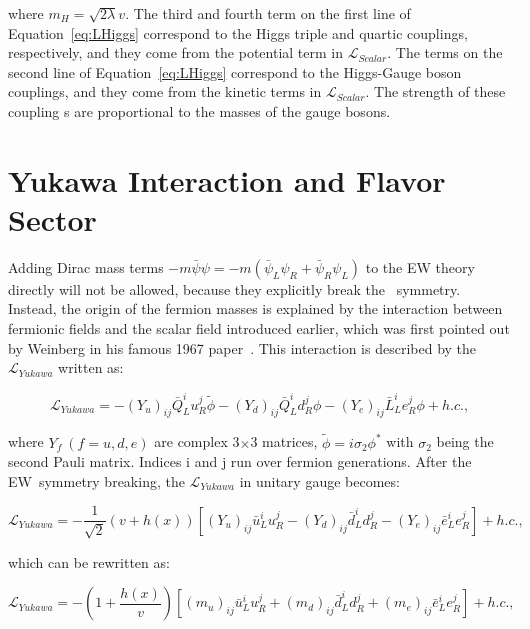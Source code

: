 where $m_{H}=\sqrt{2\lambda}v$. The third and fourth term on the first line of Equation~\ref{eq:LHiggs} correspond to the Higgs triple and quartic couplings, respectively, and they come from the potential term in $\mathcal{L}_{Scalar}$. The terms on the second line of Equation~\ref{eq:LHiggs} correspond to the Higgs-Gauge boson couplings, and they come from the kinetic terms in $\mathcal{L}_{Scalar}$. The strength of these coupling s are proportional to the masses of the gauge bosons. 

\section{Yukawa Interaction and Flavor Sector}
\label{sec:Flavor}

Adding Dirac mass terms $-m\bar{\psi}\psi=-m(\bar{\psi}_{L}\psi_{R}+\bar{\psi}_{R}\psi_{L})$ to the \ac{EW} theory directly will not be allowed, because they explicitly break the \ew~symmetry. Instead, the origin of the fermion masses is explained by the interaction between fermionic fields and the scalar field introduced earlier, which was first pointed out by Weinberg in his famous 1967 paper~\cite{Weinberg:1967tq}. This interaction is described by the $\mathcal{L}_{Yukawa}$ written as:

\begin{equation}
\mathcal{L}_{Yukawa}=-(Y_{u})_{ij}\bar{Q}_{L}^{i}u_{R}^{j}\tilde{\phi}-(Y_{d})_{ij}\bar{Q}_{L}^{i}d_{R}^{j}\phi-(Y_{e})_{ij}\bar{L}_{L}^{i}e_{R}^{j}\phi + h.c.,
\end{equation}

where $Y_{f}~(f=u,d,e)$ are complex 3$\times$3 matrices, $\tilde{\phi}=i\sigma_{2}\phi^{*}$ with $\sigma_{2}$ being the second Pauli matrix. Indices i and j run over fermion generations. After the \ac{EW}~symmetry breaking, the $\mathcal{L}_{Yukawa}$ in unitary gauge becomes:

\begin{equation}
\mathcal{L}_{Yukawa}=-\frac{1}{\sqrt{2}}(v+h(x))[(Y_{u})_{ij}\bar{u}_{L}^{i}u_{R}^{j}-(Y_{d})_{ij}\bar{d}_{L}^{i}d_{R}^{j}-(Y_{e})_{ij}\bar{e}_{L}^{i}e_{R}^{j}] + h.c.,
\end{equation}

which can be rewritten as:

\begin{equation}
\mathcal{L}_{Yukawa}=-(1+\frac{h(x)}{v})[(m_{u})_{ij}\bar{u}_{L}^{i}u_{R}^{j}+(m_{d})_{ij}\bar{d}_{L}^{i}d_{R}^{j}+(m_{e})_{ij}\bar{e}_{L}^{i}e_{R}^{j}] + h.c.,
\end{equation}

